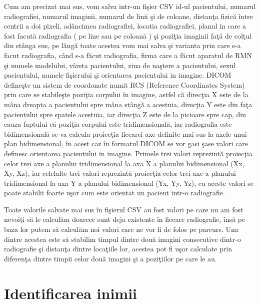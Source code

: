 Cum am precizat mai sus, vom salva intr-un fi\c{s}ier CSV id-ul pacientului, numarul radiografiei, numarul imaginii, numarul de linii \c{s}i de coloane, distan\c{t}a fizic\u{a} \^{i}ntre centrii a doi pixeli, ad\^{a}ncimea radiografiei, locatia radiografiei, planul in care a fost facut\u{a} radiografia ( pe line sau pe coloan\u{a} ) \c{s}i pozi\c{t}ia imaginii fa\c{t}\u{a} de col\c{t}ul din st\^{a}nga sus, pe l\^{a}ng\u{a} toate acestea vom mai salva \c{s}i varianta prin care s-a facut radiografia, c\^{a}nd s-a f\u{a}cut radiografia, firma care a f\u{a}cut aparatul de RMN \c{s}i numele modelului, v\^{a}rsta pacientului, ziua de na\c{s}tere a pacientului, sexul pacientului, numele fi\c{s}ierului \c{s}i orientarea pacientului in imagine. DICOM define\c{s}te un sistem de coordonate numit RCS (Reference Coordinates System) prin care se stabile\c{s}te pozi\c{t}ia corpului  \^{i}n imagine, astfel c\u{a} direc\c{t}ia X este de la m\^{a}na dreapta a pacientului spre m\^{a}na st\^{a}ng\u{a} a acestuia, direc\c{t}ia Y este din fa\c{t}a pacientului spre spatele acestuia, iar direc\c{t}ia Z este de la picioare spre cap, din cauza faptului c\u{a} pozi\c{t}ia corpului este tridimensional\u{a}, iar radiografia este bidimensional\u{a} se va calcula proiec\c{t}ia fiecarei axe definite mai sus la axele unui plan bidimensional, \^{i}n acest caz \^{i}n formatul DICOM se vor gasi \c{s}ase valori care definesc orientarea pacientului in imagine. Primele trei valori reprezint\u{a} proiec\c{t}ia celor trei axe a planului tridimensional la axa X a planului bidimensional (Xx, Xy, Xz), iar celelalte trei valori reprezint\u{a} proiec\c{t}ia celor trei axe a planului tridimensional la axa Y a planului bidimensional (Yx, Yy, Yz), cu aceste valori se poate stabilii foarte u\c{s}or cum este orientat un pacient intr-o radiografie.

\par

Toate valorile salvate mai sus \^{i}n fi\c{s}ierul CSV au fost valori pe care nu am fost nevoi\c{t}i s\u{a} le calcul\u{a}m doarece sunt deja existente \^{i}n fiecare radiografie, \^{i}ns\u{a} pe baza lor putem s\u{a} calcul\u{a}m noi valori care ne vor fi de folos pe parcurs. Una dintre acestea este s\u{a} stabilim timpul dintre dou\u{a} imagini consecutive dintr-o radiografie \c{s}i distan\c{t}a dintre loca\c{t}iile lor, acestea pot fi u\c{s}or calculate prin diferen\c{t}a dintre timpii  celor dou\u{a} imagini \c{s}i a pozi\c{t}iilor pe care le au.

\section{Identificarea inimii}

